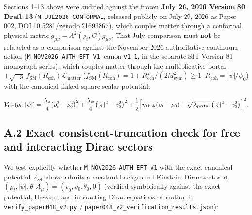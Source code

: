\documentclass[
  american,
  11pt,
  letterpaper,
]{article}
\begin{document}
Sections 1--13 above were audited against the frozen \textbf{July 26, 2026 Version 80 Draft 13} (\nolinkurl{M_JUL2026_CONFORMAL}, released publicly on July 29, 2026 as Paper 002, DOI 10.5281/zenodo.21693867), which couples matter through a conformal physical metric \(\tilde{g}_{\mu\nu} = A^2(\rho_t, C) g_{\mu\nu}\). That July comparison must \textbf{not} be relabeled as a comparison against the November 2026 authoritative continuum action (\nolinkurl{M_NOV2026_AUTH_EFT_V1}, canon \texttt{v1\_1}, in the separate SIT Version 81 monograph series), which couples matter through the multiplicative portal \(+\sqrt{-g}\,f_{\mathrm{SM}}(R_{\mathrm{coh}})\mathcal{L}_{\mathrm{matter}}\) (\(f_{\mathrm{SM}}(R_{\mathrm{coh}}) = 1 + R_{\mathrm{coh}}^2/(2 M_{\mathrm{sym}}^2) \ge 1\), \(R_{\mathrm{coh}} = |\psi|/\psi_0\)) with the canonical linked-square scalar potential:

\begin{equation}
V_{\mathrm{tot}}(\rho_t, |\psi|)
= \frac{\lambda_\rho}{4}\bigl(\rho_t^2 - \rho_0^2\bigr)^2
+ \frac{\lambda_\psi}{4}\bigl(|\psi|^2 - v_0^2\bigr)^2
+ \frac{1}{2}\Bigl[m_{\mathrm{link}}(\rho_t - \rho_0) - \sqrt{\lambda_{\mathrm{portal}}}\,\bigl(|\psi|^2 - v_0^2\bigr)\Bigr]^2.
\end{equation}

\subsection{A.2 Exact consistent-truncation check for free and interacting Dirac sectors}\label{a.2-exact-consistent-truncation-check-for-free-and-interacting-dirac-sectors}

We test explicitly whether \nolinkurl{M_NOV2026_AUTH_EFT_V1} with the exact canonical potential \(V_{\mathrm{tot}}\) above admits a constant-background Einstein--Dirac sector at \((\rho_t, |\psi|, \theta, A_\mu) = (\rho_0, v_0, \theta_0, 0)\) (verified symbolically against the exact potential, Hessian, and interacting Dirac equations of motion in \nolinkurl{verify_paper048_v2.py} / \nolinkurl{paper048_v2_verification_results.json}):
\end{document}
